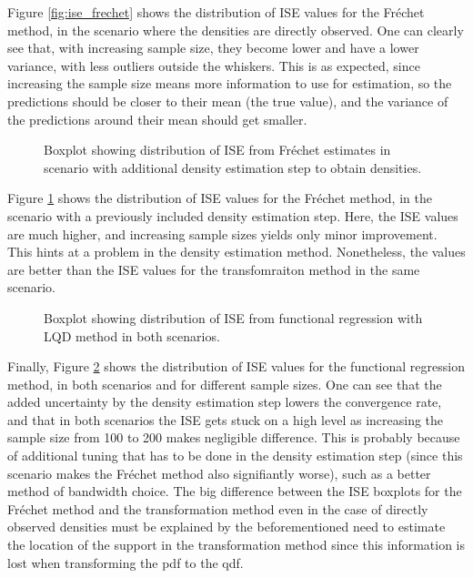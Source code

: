 Figure \ref{fig:ise_frechet} shows the distribution of ISE values for the Fréchet method,
in the scenario where the densities are directly observed. One can clearly see that, with
increasing sample size, they become lower and have a lower variance, with less outliers
outside the whiskers. This is as expected, since increasing the sample size
means more information to use for estimation, so the predictions should be closer to
their mean (the true value), and the variance of the predictions around their mean should
get smaller.

\begin{figure}[h]
    \centering
    \resizebox{1\textwidth}{!}{}
    \caption[Simulation results: ISE boxplot --- Fréchet method with estimated densities]{Boxplot
    showing distribution of ISE from Fréchet estimates in scenario with additional
    density estimation step to obtain densities.}
    \label{fig:ise_frechet_denstimation}
\end{figure}

Figure \ref{fig:ise_frechet_denstimation} shows the distribution of ISE values for
the Fréchet method, in the scenario with a previously included density estimation step.
Here, the ISE values are much higher, and increasing sample sizes yields only minor
improvement. This hints at a problem in the density estimation method. Nonetheless,
the values are better than the ISE values for the transfomraiton method in the same
scenario.

\begin{figure}[h]
    \centering
    \resizebox{\textwidth}{!}{}
    \caption[Simulation results: ISE boxplot --- functional regression]{Boxplot showing
    distribution of ISE from functional regression with LQD method in both scenarios.}
    \label{fig:ise_func_reg_both}
\end{figure}

Finally, Figure \ref{fig:ise_func_reg_both} shows the distribution of ISE values for
the functional regression method, in both scenarios and for different sample sizes. One 
can see that the added uncertainty by the density estimation step lowers the convergence
rate, and that in both scenarios the ISE gets stuck on a high level as increasing the
sample size from 100 to 200 makes negligible difference. This is probably
because of additional tuning that has to be done in the density estimation step (since
this scenario makes the Fréchet method also signifiantly worse), such as a better method
of bandwidth choice. The big difference between the ISE boxplots for the Fréchet method and
the transformation method even in the case of directly observed densities must be explained 
by the beforementioned need to estimate the location of the support in the transformation
method since this information is lost when transforming the pdf to the qdf.